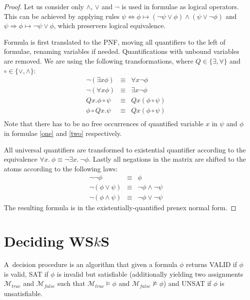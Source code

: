 	\begin{proof}
Let us consider only $\wedge$, $\vee$ and $\neg$ is used in formulae as logical
operators. This can be achieved by applying rules $\psi \Leftrightarrow \phi
\mapsto (\neg \psi \vee \phi) \wedge (\psi \vee \neg \phi)$ and $\psi
\Rightarrow \phi \mapsto \neg \psi \vee \phi$, which preservers logical
equivalence.
	
Formula is first translated to the PNF, moving all quantifiers to the left
of formulae, renaming variables if needed. Quantifications with unbound
variables are removed. We are using the following transformations, where $Q \in
\{\exists, \forall\}$ and $\circ \in \{\vee, \wedge\}$:
	\begin{eqnarray}
	 \neg(\exists x \phi) & \equiv & \forall x\neg \phi\\
	 \neg(\forall x \phi) & \equiv & \exists x\neg \phi\\
	 Qx.\phi \circ \psi & \equiv & Qx(\phi \circ \psi)\label{one}\\
	 \phi \circ Qx.\psi & \equiv & Qx(\phi \circ \psi)\label{two}\\
	\end{eqnarray}
Note that there has to be no free occurrences of quantified variable $x$ in
$\psi$ and $\phi$ in formulae \ref{one} and \ref{two} respectively.
	
All universal quantifiers are transformed to existential quantifier
according to the equivalence $\forall x.\ \phi \equiv \neg\exists x.\ \neg\phi$.
Lastly all negations in the matrix are shifted to the atoms according to the
following laws:
	\begin{eqnarray}
	 \neg\neg\phi & \equiv & \phi\\
	 \neg(\phi\vee \psi) & \equiv & \neg \phi \wedge \neg \psi\\
	 \neg(\phi\wedge \psi) & \equiv & \neg \phi \vee \neg \psi 
	\end{eqnarray}
 The resulting formula is in the existentially-quantified prenex normal form. 
	\end{proof}
	
\section{Deciding WS$k$S}\label{classical}

A~decision procedure is an algorithm that given a formula $\phi$ returns VALID
if $\phi$ is valid, SAT if $\phi$ is invalid but satisfiable (additionally
yielding two assignments $\mathcal{M}_{true}$ and $\mathcal{M}_{false}$ such
that $\mathcal{M}_{\mathit{true}} \models \phi$ and
$\mathcal{M}_{\mathit{false}} \not\models \phi$) and UNSAT if $\phi$ is unsatisfiable.

